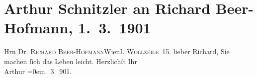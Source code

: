 

         
         \renewcommand{\erwaehntePersonen}{Personen: Richard Beer-Hofmann}
         \renewcommand{\erwaehnteOrte}{Orte: I., Innere Stadt, Wien, Wollzeile}
         \renewcommand{\erwaehnteWerke}{}
               \section[Arthur Schnitzler an Richard Beer-Hofmann, 1. 3. 1901]{ Arthur Schnitzler an Richard Beer-Hofmann, 1. 3. 1901}\nopagebreak{}\rehead{ }\begin{ledgroupsized}[t]{13cm}\normalsize\beginnumbering \toendnotes[C]{\smallbreak\pagebreak[2]} 
\pstart{}{\pb}Hrn Dr. \textsc{Richard
                     Beer-Hofmann}\pend{}\pstart{}Wien\pend{}\pstart{}\textsc{I. Wollzeile 15}. \pend{}{\bigskip}\pstart
           \noindent{}{\pb}lieber Richard, Sie machen ſich das Leben leicht.\pend
           \pstart
           Herzlichſt Ihr{\\[\baselineskip]}\spacefill\mbox{Arthur}\pend
           \leftskip=0em{}. 3. 901.\pend
           
         
         \endnumbering{}\end{ledgroupsized}  \newcommand{\dateiname}{L01101}\newcommand{\titel}{Arthur Schnitzler an Richard Beer-Hofmann, 1. 3. 1901}\newcommand{\editorInnen}{Martin Anton Müller und Gerd-Hermann Susen}
      